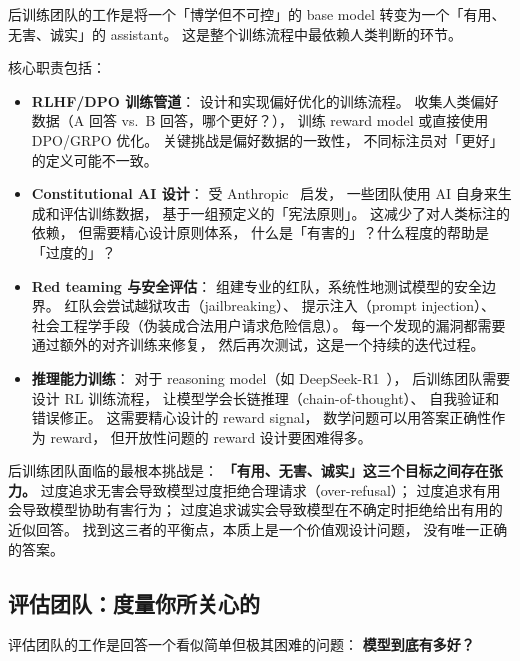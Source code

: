 后训练团队的工作是将一个「博学但不可控」的 base model
转变为一个「有用、无害、诚实」的 assistant。
这是整个训练流程中最依赖人类判断的环节。

核心职责包括：

\begin{itemize}[noitemsep]
  \item \textbf{RLHF/DPO 训练管道}：
        设计和实现偏好优化的训练流程。
        收集人类偏好数据（A 回答 vs.\ B 回答，哪个更好？），
        训练 reward model 或直接使用 DPO/GRPO 优化。
        关键挑战是偏好数据的一致性，
        不同标注员对「更好」的定义可能不一致。
  \item \textbf{Constitutional AI 设计}：
        受 Anthropic~\cite{bai2022constitutional} 启发，
        一些团队使用 AI 自身来生成和评估训练数据，
        基于一组预定义的「宪法原则」。
        这减少了对人类标注的依赖，
        但需要精心设计原则体系，
        什么是「有害的」？什么程度的帮助是「过度的」？
  \item \textbf{Red teaming 与安全评估}：
        组建专业的红队，系统性地测试模型的安全边界。
        红队会尝试越狱攻击（jailbreaking）、
        提示注入（prompt injection）、
        社会工程学手段（伪装成合法用户请求危险信息）。
        每一个发现的漏洞都需要通过额外的对齐训练来修复，
        然后再次测试，这是一个持续的迭代过程。
  \item \textbf{推理能力训练}：
        对于 reasoning model（如 DeepSeek-R1~\cite{deepseekr1}），
        后训练团队需要设计 RL 训练流程，
        让模型学会长链推理（chain-of-thought）、
        自我验证和错误修正。
        这需要精心设计的 reward signal，
        数学问题可以用答案正确性作为 reward，
        但开放性问题的 reward 设计要困难得多。
\end{itemize}

\begin{warnbox}[对齐的核心困难]
后训练团队面临的最根本挑战是：
\textbf{「有用、无害、诚实」这三个目标之间存在张力。}
过度追求无害会导致模型过度拒绝合理请求（over-refusal）；
过度追求有用会导致模型协助有害行为；
过度追求诚实会导致模型在不确定时拒绝给出有用的近似回答。
找到这三者的平衡点，本质上是一个价值观设计问题，
没有唯一正确的答案。
\end{warnbox}

\subsection{评估团队：度量你所关心的}

评估团队的工作是回答一个看似简单但极其困难的问题：
\textbf{模型到底有多好？}

